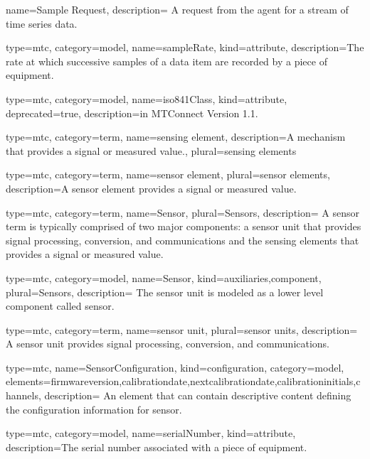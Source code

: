 {
  name={Sample Request},
  description= {A request from the \gls{agent} for a stream of time series data.}
}


{
  type=mtc,
  category=model,
  name={sampleRate},
  kind={attribute},
  description={The rate at which successive samples of a data item are recorded by a piece of equipment.}
}

{
  type=mtc,
  category=model,
  name={iso841Class},
  kind={attribute},
  deprecated={true},
  description={\DEPRECATED in MTConnect Version 1.1.}
}


{
  type=mtc,
  category=term,
  name={sensing element},
  description={A mechanism that provides a signal or measured value.},
  plural={sensing elements}
}


{
  type=mtc,
  category=term,
  name={sensor element},
  plural={sensor elements},
  description={A \gls{sensor element} provides a signal or measured value.}
}


{
  type=mtc,
  category=term,
  name={Sensor},
  plural={Sensors},
  description= {A \gls{sensor term} is typically comprised of two major components: a \gls{sensor unit} that provides signal processing, conversion, and communications and the \glspl{sensing element} that provides a signal or measured value.}
}


{
  type=mtc,
  category=model,
  name={Sensor},
  kind={auxiliaries,component},
  plural={Sensors},
  description= {The \gls{sensor unit} is modeled as a \gls{lower level} \gls{component} called \gls{sensor}.}
}


{
  type=mtc,
  category=term,
  name={sensor unit},
  plural={sensor units},
  description= {A \gls{sensor unit} provides signal processing, conversion, and communications.}
}


{
  type=mtc,
  name={SensorConfiguration},
  kind={configuration},
  category=model,
  elements={\gls{firmwareversion},\gls{calibrationdate},\gls{nextcalibrationdate},\gls{calibrationinitials},\gls{channels}},
  description= {An element that can contain descriptive content defining the configuration information for \gls{sensor}.}
}


{
  type=mtc,
  category=model,
  name={serialNumber},
  kind={attribute},
  description={The serial number associated with a piece of equipment. }
}


